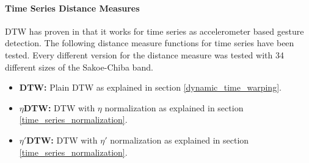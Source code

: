 \paragraph{Time Series Distance Measures} \label{time_series_distance_measures}
DTW has proven in \cite{liu2009uwave} that it works for time series as accelerometer based gesture detection. The
following distance measure functions for time series have been tested. Every different version for the distance measure
was tested with 34 different sizes of the Sakoe-Chiba band.

\begin{itemize}
    \item \textbf{DTW:} Plain DTW as explained in section \ref{dynamic_time_warping}.
    \item \textbf{$\eta$DTW:} DTW with $\eta$ normalization as explained in section \ref{time_series_normalization}.
    \item \textbf{$\eta '$DTW:} DTW with $\eta '$ normalization as explained in section \ref{time_series_normalization}.
\end{itemize}

